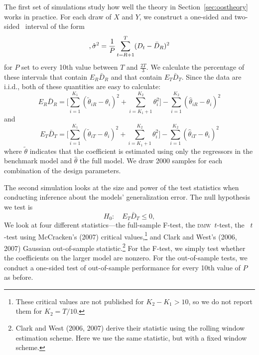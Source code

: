 \documentclass[11pt]{article}
\newcommand{\oosA}{\bar{D}_{R}}
\newcommand{\oosB}{\bar{D}_{T}}
\newcommand{\dmw}{\textsc{dmw}}
\begin{document}
The first set of simulations study how well the theory in
Section~\ref{sec:oostheory} works in practice.  For each draw of $X$
and $Y$, we construct a one-sided and two-sided \oos\ interval of the
form
\begin{equation*}
  [ \oosA - 1.28 \hat{\sigma}, \infty) \quad\text{and}\quad
  [ \oosA - 1.64 \hat{\sigma}, \oosA + 1.64\ \hat{\sigma}], \\
  \hat\sigma^2 = \frac1P \sum_{t=R+1}^T (D_t - \oosA)^{2}
\end{equation*}
for $P$ set to every 10th value between $T$ and $\frac{2T}{3}$.  We
calculate the percentage of these intervals that contain $E_R \oosA$
and that contain $E_T \oosB$.  Since the data are i.i.d., both of
these quantities are easy to calculate:
\begin{equation*}
  E_R \oosA = \Bigg[\sum_{i=1}^{K_1} (\tilde{\theta}_{iR} - \theta_i)^2 +
  \sum_{i=K_1+1}^{K_2}\theta_i^2\Bigg] - \sum_{i=1}^{K_2} (\hat{\theta}_{iR} -
  \theta_i)^2
\end{equation*}
and
\begin{equation*}
  E_T \oosB = \Bigg[\sum_{i=1}^{K_1} (\tilde{\theta}_{iT} - \theta_i)^2 +
  \sum_{i=K_1+1}^{K_2}\theta_i^2\Bigg] - \sum_{i=1}^{K_2} (\hat{\theta}_{iT} -
  \theta_i)^2
\end{equation*}
where $\tilde{\theta}$ indicates that the coefficient is estimated
using only the regressors in the benchmark model and $\hat{\theta}$
the full model.  We draw 2000 samples for each combination of the
design parameters.

The second simulation looks at the size and power of the test
statistics when conducting inference about the models' generalization
error.  The null hypothesis we test is 
\begin{equation}\label{eq:9}
  H_0:\quad E_T \oosB \leq 0,
\end{equation}
We look at four different statistics---the full-sample F-test, the
\dmw\ $t$-test, the
\oos\ $t$-test using McCracken's (2007)
critical values,\footnote{These critical values are not published for
  $K_2-K_1>10$, so we do not report them for $K_2 = T/10$.}
and Clark and West's (2006, 2007) Gaussian out-of-sample
statistic.\footnote{Clark and West (2006, 2007) derive their statistic
using the rolling window estimation scheme.  Here we use the same
statistic, but with a fixed window scheme.}
For the F-test, we simply test whether the coefficients on the larger
model are nonzero.  For the out-of-sample tests, we conduct a
one-sided test of out-of-sample performance for every 10th value of
$P$ as before.
\end{document}
